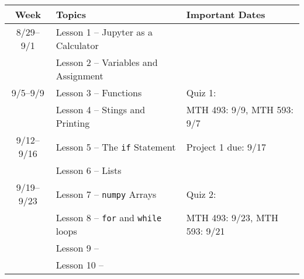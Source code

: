 \documentclass[12pt]{article}
\begin{document}
\sffamily

\begin{tabularx}{\textwidth}{ |c|X|l|} \hline
  \textbf{Week} & \textbf{Topics} & \textbf{Important Dates}  \\\hline\hline 
8/29--9/1   & Lesson 1 -- Jupyter as a Calculator & \\
            & Lesson 2 -- Variables and Assignment & \\\hline
9/5--9/9    & Lesson 3 -- Functions            & Quiz 1: \\
            & Lesson 4 --  Stings and Printing & MTH 493: 9/9, MTH 593: 9/7\\\hline
9/12--9/16  & Lesson 5 --  The \texttt{if} Statement & Project 1 due: 9/17\\
            & Lesson 6 --  Lists & \\\hline
9/19--9/23  & Lesson 7 --  \texttt{numpy} Arrays                 & Quiz 2:\\
            & Lesson 8 --  \texttt{for} and \texttt{while} loops & MTH 493: 9/23, MTH 593: 9/21\\\hline
            & Lesson 9 --   & \\
            & Lesson 10 --  & \\\hline
   
\end{tabularx}
\end{document}
